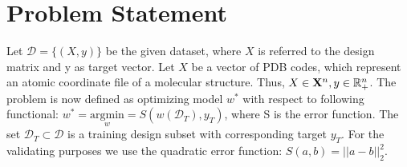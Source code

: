 \section{Problem Statement}
Let $\mathcal{D} = \{(X, y)\}$ be the given dataset, where $X$ is referred to the design matrix and y as target vector. Let $X$ be a vector of PDB codes, which represent an atomic coordinate file of a molecular structure. Thus, $X \in \mathbf{X}^n, y \in \mathbb{R}_+^n$. The problem is now defined as optimizing model $w^*$ with respect to following functional: $w^* = \underset{w}{\mathrm{argmin}} = S(w(\mathcal{D}_T), y_T)$, where S is the error function. The set $\mathcal{D}_T \subset \mathcal{D}$ is a training design subset with corresponding target $y_T$. For the validating purposes we use the quadratic error function: $S(a, b) = ||a-b||_2^2$.